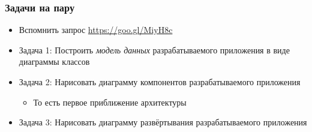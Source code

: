 \documentclass{../../slides-style}
\begin{document}
    \begin{frame}
        \frametitle{Задачи на пару}
        \begin{itemize}
            \item Вспомнить запрос \url{https://goo.gl/MiyH8c}
            \item Задача 1: Построить \textit{модель данных} разрабатываемого приложения в виде диаграммы классов
            \item Задача 2: Нарисовать диаграмму компонентов разрабатываемого приложения
            \begin{itemize}
                \item То есть первое приближение архитектуры
            \end{itemize}
            \item Задача 3: Нарисовать диаграмму развёртывания разрабатываемого приложения
        \end{itemize}
    \end{frame}
\end{document}
